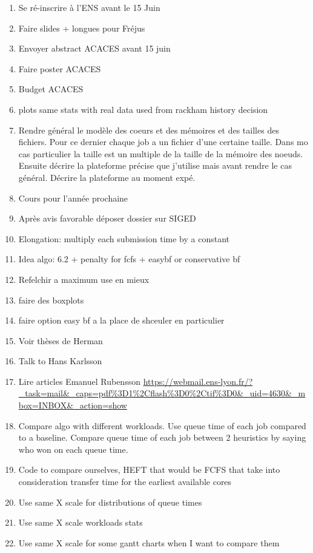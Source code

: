\documentclass[a4paper]{article}
\begin{document}
\begin{enumerate}
			\item Se ré-inscrire à l'ENS avant le 15 Juin
			\item Faire slides + longues pour Fréjus
			\item Envoyer abstract ACACES avant 15 juin
			\item Faire poster ACACES
			\item Budget ACACES
			\item plots same stats with real data used from rackham history decision
			\item Rendre général le modèle des coeurs et des mémoires et des tailles des fichiers. Pour ce dernier chaque job a un fichier d'une certaine taille. Dans mo cas particulier la taille est un multiple de la taille de la mémoire des noeuds. Ensuite décrire la plateforme précise que j'utilise mais avant rendre le cas général. Décrire la plateforme au moment expé.
			\item Cours pour l'année prochaine
			\item Après avis favorable déposer dossier sur SIGED
			\item Elongation: multiply each submission time by a constant
			\item Idea algo: 6.2 + penalty for fcfs + easybf or conservative bf
			\item Refelchir a maximum use en mieux
			\item faire des boxplots
			\item faire option easy bf a la place de shceuler en particulier
			\item Voir thèses de Herman
			\item Talk to Hans Karlsson
			\item Lire articles Emanuel Rubensson \url{https://webmail.ens-lyon.fr/?_task=mail&_caps=pdf%3D1%2Cflash%3D0%2Ctif%3D0&_uid=4630&_mbox=INBOX&_action=show}
			\item Compare algo with different workloads. Use queue time of each job compared to a baseline. Compare queue time of each job between 2 heuristics by saying who won on each queue time.
			\item Code to compare ourselves, HEFT that would be FCFS that take into consideration transfer time for the earliest available cores
			\item Use same X scale for distributions of queue times
			\item Use same X scale workloads stats
			\item Use same X scale for some gantt charts when I want to compare them

\end{enumerate}
\end{document}
